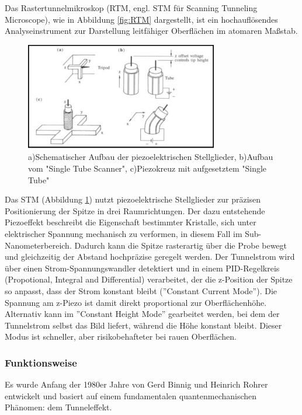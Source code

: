 Das Rastertunnelmikroskop (RTM, engl. STM für Scanning Tunneling Microscope), wie in Abbildung \ref{fig:RTM} dargestellt, ist ein hochauflösendes Analyseinstrument zur Darstellung leitfähiger Oberflächen im atomaren Maßstab.
\begin{figure}[H]
\centering
\includegraphics[width=0.75\textwidth]{figs/RTM piezo}
\caption{a)Schematischer Aufbau der piezoelektrischen Stellglieder, b)Aufbau vom "Single Tube Scanner", c)Piezokreuz mit aufgesetztem "Single Tube" \cite{piezo}}
\label{fig:piezo}
\end{figure}
Das STM (Abbildung \ref{fig:piezo}) nutzt piezoelektrische Stellglieder zur präzisen Positionierung der Spitze in drei Raumrichtungen. Der dazu entstehende Piezoeffekt beschreibt die Eigenschaft bestimmter Kristalle, sich unter elektrischer Spannung mechanisch zu verformen, in diesem Fall im Sub-Nanometerbereich. Dadurch kann die Spitze rasterartig über die Probe bewegt und gleichzeitig der Abstand hochpräzise geregelt werden. Der Tunnelstrom wird über einen Strom-Spannungswandler detektiert und in einem PID-Regelkreis (Propotional, Integral and Differential) verarbeitet, der die z-Position der Spitze so anpasst, dass der Strom konstant bleibt (''Constant Current Mode''). Die Spannung am z-Piezo ist damit direkt proportional zur Oberflächenhöhe. Alternativ kann im ''Constant Height Mode'' gearbeitet werden, bei dem der Tunnelstrom selbst das Bild liefert, während die Höhe konstant bleibt. Dieser Modus ist schneller, aber risikobehafteter bei rauen Oberflächen.


\subsubsection{Funktionsweise}
Es wurde Anfang der 1980er Jahre von Gerd Binnig und Heinrich Rohrer entwickelt und basiert auf einem fundamentalen quantenmechanischen Phänomen: dem Tunneleffekt.

